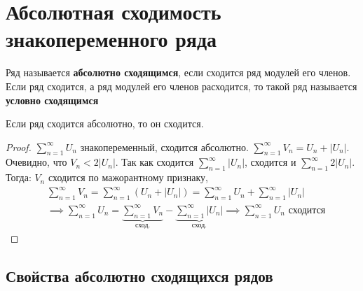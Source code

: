 \section{Абсолютная сходимость знакопеременного ряда}
\begin{opr}
    Ряд называется \textbf{абсолютно сходящимся}, если сходится ряд модулей его членов.
    Если ряд сходится, а ряд модулей его членов расходится, то такой ряд называется 
    \textbf{условно сходящимся}
\end{opr}

\begin{thm}
    Если ряд сходится абсолютно, то он сходится.\\
    \begin{proof}
        \(\sum_{n=1}^{\infty}U_{n}\) знакопеременный, сходится абсолютно.
        \(\sum_{n=1}^{\infty}V_{n} = U_{n} + |U_{n}|\).
        Очевидно, что \(V_{n} < 2|U_{n}|\). 
        Так как сходится \(\sum_{n=1}^{\infty} |U_{n}|\), 
        сходится и \(\sum_{n=1}^{\infty} 2|U_{n}|\).
        Тогда: \(V_{n}\) сходится по мажорантному признаку,
        \begin{equation}
            \begin{align*}
                &\sum_{n=1}^{\infty}V_{n} = \sum_{n=1}^{\infty}(U_{n} + |U_{n}|) = \sum_{n=1}^{\infty}U_{n} + \sum_{n=1}^{\infty}|U_{n}|\\
                &\implies \sum_{n=1}^{\infty}U_{n} = \underbrace{\sum_{n=1}^{\infty}V_{n}}_{\text{сход.}} - \underbrace{\sum_{n=1}^{\infty}|U_{n}|}_{\text{сход.}} \implies \sum_{n=1}^{\infty}U_{n} \text{ сходится}
            \end{align*}
        \end{equation}
    \end{proof}
\end{thm}

\subsection{Свойства абсолютно сходящихся рядов}
